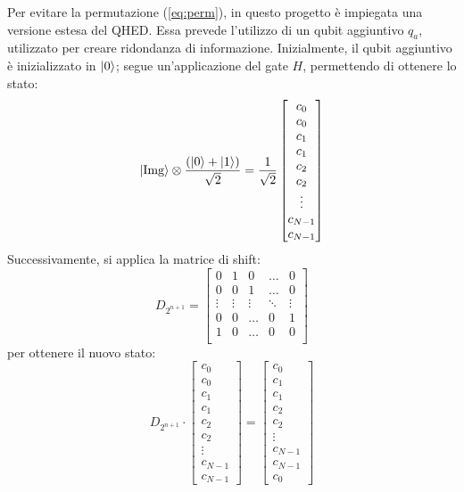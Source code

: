 Per evitare la permutazione (\ref{eq:perm}), in questo progetto
è impiegata una
versione estesa del QHED. Essa prevede l'utilizzo di un qubit aggiuntivo $q_a$,
utilizzato per creare ridondanza di informazione. Inizialmente, il qubit
aggiuntivo è inizializzato in $\lvert0\rangle$; segue un'applicazione del gate $H$,
permettendo di ottenere lo stato:
\begin{equation*}
	\lvert\text{Img}\rangle \otimes 
		\frac{(\lvert0\rangle + \lvert1\rangle)}{\sqrt 2} =
		\frac{1}{\sqrt 2} \begin{bmatrix}
			c_0\\c_0\\c_1\\c_1\\c_2\\c_2\\\vdots\\c_{N-1}\\c_{N-1}
		\end{bmatrix}
\end{equation*}
Successivamente, si applica la matrice di shift:
\begin{equation*}
	D_{2^{n+1}} = \begin{bmatrix}
		0 & 1 & 0 &\ldots& 0 \\
		0 & 0 & 1 &\ldots& 0 \\
		\vdots & \vdots & \vdots & \ddots & \vdots \\
		0 & 0 &\ldots & 0 & 1\\
		1 & 0 &\ldots & 0 & 0\\
	\end{bmatrix}
	\label{eq:eq-perm-matrix}
\end{equation*}
per ottenere il nuovo stato:
\begin{equation*}
	D_{2^{n+1}} \cdot \begin{bmatrix}
		c_0\\c_0\\c_1\\c_1\\c_2\\c_2\\\vdots\\c_{N-1}\\c_{N-1}
	\end{bmatrix} = \begin{bmatrix}
		c_0\\c_1\\c_1\\c_2\\c_2\\\vdots\\c_{N-1}\\c_{N-1}\\c_0
	\end{bmatrix}
	\label{eq:perm-state}
\end{equation*}
